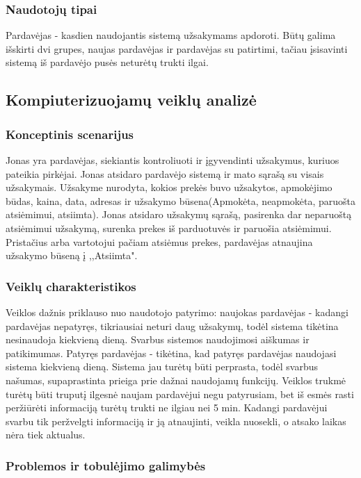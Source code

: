 \documentclass[oneside]{VUMIFPSkursinis}
\begin{document}
		\subsubsection{Naudotojų tipai}
			Pardavėjas - kasdien naudojantis sistemą užsakymams apdoroti. Būtų galima išskirti dvi grupes, naujas pardavėjas ir pardavėjas su patirtimi, tačiau įsisavinti sistemą iš pardavėjo pusės neturėtų trukti ilgai.
	\subsection{Kompiuterizuojamų veiklų analizė}
		\subsubsection{Konceptinis scenarijus}
			Jonas yra pardavėjas, siekiantis kontroliuoti ir įgyvendinti užsakymus, kuriuos pateikia pirkėjai. Jonas atsidaro pardavėjo sistemą ir mato sąrašą su visais užsakymais. Užsakyme nurodyta, kokios prekės buvo užsakytos, apmokėjimo būdas, kaina, data, adresas ir užsakymo būsena(Apmokėta, neapmokėta, paruošta atsiėmimui, atsiimta). Jonas atsidaro užsakymų sąrašą, pasirenka dar neparuoštą atsiėmimui užsakymą, surenka prekes iš parduotuvės ir paruošia atsiėmimui. Pristačius arba vartotojui pačiam atsiėmus prekes, pardavėjas atnaujina užsakymo būseną į ,,Atsiimta". 
			
		\subsubsection{Veiklų charakteristikos}
			Veiklos dažnis priklauso nuo naudotojo patyrimo: naujokas pardavėjas - kadangi pardavėjas nepatyręs, tikriausiai neturi daug užsakymų, todėl sistema tikėtina nesinaudoja kiekvieną dieną. Svarbus sistemos naudojimosi aiškumas ir patikimumas. Patyręs pardavėjas - tikėtina, kad patyręs pardavėjas naudojasi sistema kiekvieną dieną. Sistema jau turėtų būti perprasta, todėl svarbus našumas, supaprastinta prieiga prie dažnai naudojamų funkcijų.
			Veiklos trukmė turėtų būti truputį ilgesnė naujam pardavėjui negu patyrusiam, bet iš esmės rasti peržiūrėti informaciją turėtų trukti ne ilgiau nei 5 min.
			Kadangi pardavėjui svarbu tik peržvelgti informaciją ir ją atnaujinti, veikla nuosekli, o atsako laikas nėra tiek aktualus.
			
		\subsubsection{Problemos ir tobulėjimo galimybės}
\end{document}
